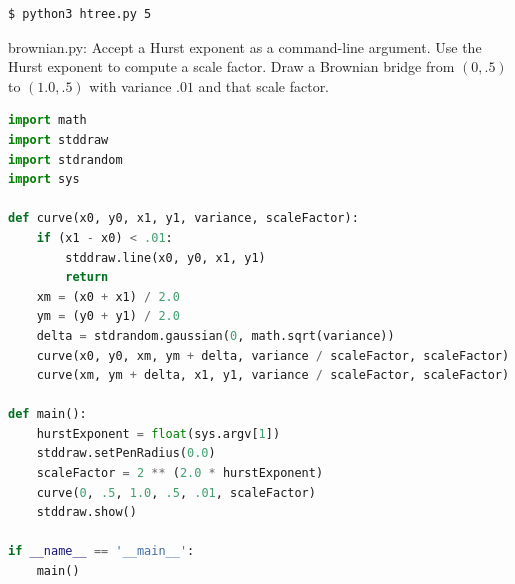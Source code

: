 \documentclass[8pt,a4paper,compress]{beamer}
\begin{document}
\begin{frame}[fragile]
\begin{minipage}{160pt}
\begin{lstlisting}[language={}]
$ python3 htree.py 5
\end{lstlisting}
\end{minipage}%
\begin{minipage}{140pt}
\hfill {}
\end{minipage}
\end{frame}

\begin{frame}[fragile]
\pause

\begin{framed}
\tiny brownian.py: Accept a Hurst exponent as a command-line argument. Use the Hurst exponent to compute a scale factor. Draw a Brownian bridge from $(0, .5)$ to $(1.0, .5)$ with variance $.01$ and that scale factor.
\end{framed}

\begin{lstlisting}[language=Python]
import math
import stddraw
import stdrandom
import sys

def curve(x0, y0, x1, y1, variance, scaleFactor):
    if (x1 - x0) < .01:
        stddraw.line(x0, y0, x1, y1)
        return
    xm = (x0 + x1) / 2.0
    ym = (y0 + y1) / 2.0
    delta = stdrandom.gaussian(0, math.sqrt(variance))
    curve(x0, y0, xm, ym + delta, variance / scaleFactor, scaleFactor)
    curve(xm, ym + delta, x1, y1, variance / scaleFactor, scaleFactor)

def main():
    hurstExponent = float(sys.argv[1])
    stddraw.setPenRadius(0.0)
    scaleFactor = 2 ** (2.0 * hurstExponent)
    curve(0, .5, 1.0, .5, .01, scaleFactor)
    stddraw.show()

if __name__ == '__main__':
    main()
\end{lstlisting}
\end{frame}
\end{document}
